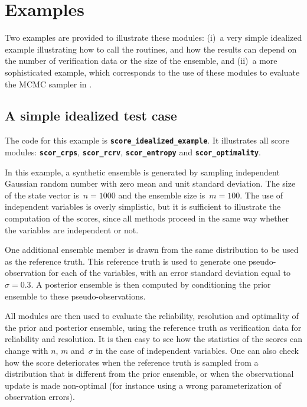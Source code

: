 \documentclass[11pt]{article}
\begin{document}
\clearpage

\section{Examples}

Two examples are provided to illustrate these modules:
(i)~a very simple idealized example illustrating how to call the routines,
and how the results can depend on the number of verification data or the size of the ensemble, and
(ii)~a more sophisticated example, which corresponds to the use of these modules
to evaluate the MCMC sampler in \citet{BRAN19}.

\subsection{A simple idealized test case}

The code for this example is {\tt\bf score\_idealized\_example}.
It illustrates all score modules: {\tt\bf scor\_crps}, {\tt\bf scor\_rcrv},
{\tt\bf scor\_entropy} and {\tt\bf scor\_optimality}.

In this example, a synthetic ensemble is generated
by sampling independent Gaussian random number
with zero mean and unit standard deviation.
The size of the state vector is~$n=1000$ and the ensemble size is~$m=100$.
The use of independent variables is overly simplistic,
but it is sufficient to illustrate the computation of the scores,
since all methods proceed in the same way
whether the variables are independent or not.

One additional ensemble member is drawn from the same distribution
to be used as the reference truth.
This reference truth is used to generate one pseudo-observation
for each of the variables, with an error standard deviation equal to~$\sigma=0.3$.
A posterior ensemble is then computed by conditioning the prior ensemble
to these pseudo-observations.

All modules are then used to evaluate the reliability, resolution
and optimality of the prior and posterior ensemble,
using the reference truth as verification data for reliability and resolution.
It is then easy to see how the statistics of the scores
can change with $n$, $m$ and~$\sigma$ in the case of independent variables.
One can also check how the score deteriorates
when the reference truth is sampled from a distribution
that is different from the prior ensemble, or
when the observational update is made non-optimal
(for instance using a wrong parameterization of observation errors).
\end{document}
